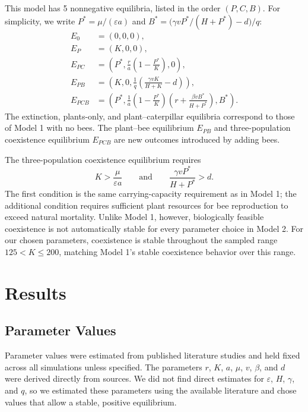 \documentclass[11pt]{amsart}
\begin{document}
This model has 5 nonnegative equilibria, listed in the order $(P,C,B)$. For simplicity, we write $P^*=\mu/(\varepsilon a)$ and $B^*=\bigl(\gamma vP^*/(H+P^*)-d\bigr)/q$:
\begin{align*}
E_0 &= (0,0,0), \\
E_P &= (K,0,0), \\
E_{PC} &= \left(P^*,\frac{r}{a}\left(1-\frac{P^*}{K}\right),0\right), \\
E_{PB} &= \left(K,0,\frac{1}{q}\left(\frac{\gamma vK}{H+K}-d\right)\right), \\
E_{PCB} &= \left(P^*,\frac{1}{a}\left(1-\frac{P^*}{K}\right)
\left(r+\frac{\beta vB^*}{H+P^*}\right),B^*\right).
\end{align*}
The extinction, plants-only, and plant--caterpillar equilibria correspond to those of Model 1 with no bees. The plant--bee equilibrium $E_{PB}$ and three-population coexistence equilibrium $E_{PCB}$ are new outcomes introduced by adding bees.

The three-population coexistence equilibrium requires
\[
K>\frac{\mu}{\varepsilon a}
\qquad\text{and}\qquad
\frac{\gamma vP^*}{H+P^*}>d.
\]
The first condition is the same carrying-capacity requirement as in Model 1; the additional condition requires sufficient plant resources for bee reproduction to exceed natural mortality. Unlike Model 1, however, biologically feasible coexistence is not automatically stable for every parameter choice in Model 2. For our chosen parameters, coexistence is stable throughout the sampled range $125<K\leq200$, matching Model 1's stable coexistence behavior over this range.






\section{Results}

\subsection{Parameter Values}
Parameter values were estimated from published literature studies and held fixed across all simulations unless specified. The parameters $r$, $K$, $a$, $\mu$, $v$, $\beta$, and $d$ were derived directly from sources. We did not find direct estimates for $\varepsilon$, $H$, $\gamma$, and $q$, so we estimated these parameters using the available literature and chose values that allow a stable, positive equilibrium.
\end{document}
